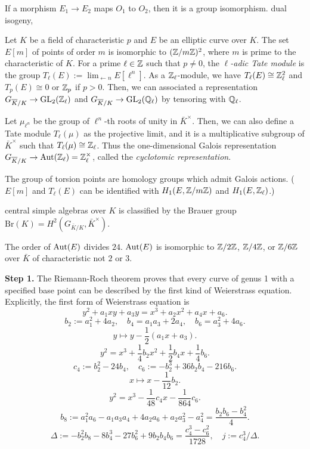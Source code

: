 \documentclass{../../large}
\begin{document}
\begin{prb}[Isogenies]
If a morphism $E_1\to E_2$ maps $O_1$ to $O_2$, then it is a group isomorphism.
dual isogeny,
\end{prb}

\begin{prb}
Let $K$ be a field of characteristic $p$ and $E$ be an elliptic curve over $K$.
The set $E[m]$ of points of order $m$ is isomorphic to $(\mathbb{Z}/m\mathbb{Z})^2$, where $m$ is prime to the characteristic of $K$.
For a prime $\ell\in\mathbb{Z}$ such that $p\ne0$, the \emph{$\ell$-adic Tate module} is the group $T_\ell(E):=\lim_{\leftarrow n}E[\ell^n]$.
As a $\mathbb{Z}_\ell$-module, we have $T_\ell(E)\cong\mathbb{Z}_\ell^2$ and $T_p(E)\cong0$ or $\mathbb{Z}_p$ if $p>0$.
Then, we can associated a representation $G_{\overline K/K}\to\mathrm{GL}_2(\mathbb{Z}_\ell)$ and $G_{\overline K/K}\to\mathrm{GL}_2(\mathbb{Q}_\ell)$ by tensoring with $\mathbb{Q}_\ell$.

Let $\mu_{\ell^n}$ be the group of $\ell^n$-th roots of unity in $\bar K^\times$.
Then, we can also define a Tate module $T_\ell(\mu)$ as the projective limit, and it is a multiplicative subgroup of $\bar K^\times$ such that $T_\ell(\mu)\cong\mathbb{Z}_\ell$.
Thus the one-dimensional Galois representation $G_{\overline K/K}\to\operatorname{Aut}(\mathbb{Z}_\ell)=\mathbb{Z}_\ell^\times$, called the \emph{cyclotomic representation}.

The group of torsion points are homology groups which admit Galois actions.
($E[m]$ and $T_\ell(E)$ can be identified with $H_1(E,\mathbb{Z}/m\mathbb{Z})$ and $H_1(E,\mathbb{Z}_\ell)$.)
\end{prb}

\begin{prb}
\end{prb}
\begin{prb}
central simple algebras over $K$ is classified by the Brauer group $\mathrm{Br}(K)=H^2(G_{\bar K/K},\bar K^\times)$.
\end{prb}
\begin{prb}
The order of $\operatorname{Aut}(E)$ divides $24$.
$\operatorname{Aut}(E)$ is isomorphic to $\mathbb{Z}/2\mathbb{Z}$, $\mathbb{Z}/4\mathbb{Z}$, or $\mathbb{Z}/6\mathbb{Z}$ over $\bar K$ of characteristic not $2$ or $3$.
\end{prb}

\textbf{Step 1.}
The Riemann-Roch theorem proves that every curve of genus 1 with a specified base point can be described by the first kind of Weierstrass equation.
Explicitly, the first form of Weierstrass equation is
\[y^2+a_1xy+a_3y=x^3+a_2x^2+a_4x+a_6.\]
\[b_2:=a_1^2+4a_2,\quad b_4=a_1a_3+2a_4,\quad b_6=a_3^2+4a_6.\]
\[y\mapsto y-\frac12(a_1x+a_3).\]
\[y^2=x^3+\frac14b_2x^2+\frac12b_4x+\frac14b_6.\]
\[c_4:=b_2^2-24b_4,\quad c_6:=-b_2^3+36b_2b_4-216b_6.\]
\[x\mapsto x-\frac1{12}b_2.\]
\[y^2=x^3-\frac1{48}c_4x-\frac1{864}c_6.\]
\[b_8:=a_1^2a_6-a_1a_3a_4+4a_2a_6+a_2a_3^2-a_4^2=\frac{b_2b_6-b_4^2}4.\]
\[\Delta:=-b_2^2b_8-8b_4^3-27b_6^2+9b_2b_4b_6=\frac{c_4^3-c_6^2}{1728},\quad j:=c_4^3/\Delta.\]
\end{document}
